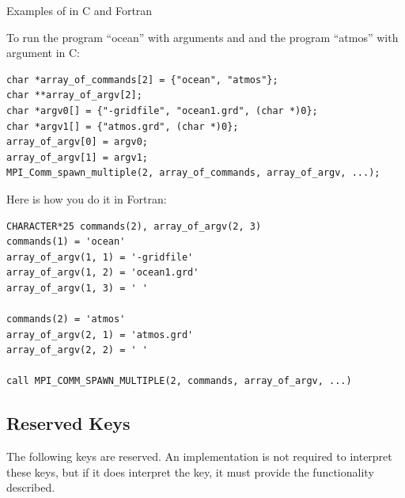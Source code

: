 \begin{example}
Examples of  in C and Fortran
%

\noindent To run the program ``ocean'' with arguments  and
 and the program ``atmos'' with argument 
in C:
\begin{lstlisting}[language={[MPI]C}]
char *array_of_commands[2] = {"ocean", "atmos"};
char **array_of_argv[2];
char *argv0[] = {"-gridfile", "ocean1.grd", (char *)0};
char *argv1[] = {"atmos.grd", (char *)0};
array_of_argv[0] = argv0;
array_of_argv[1] = argv1;
MPI_Comm_spawn_multiple(2, array_of_commands, array_of_argv, ...);
\end{lstlisting}
Here is how you do it in Fortran:
\begin{lstlisting}[language={[MPI]Fortran}]
CHARACTER*25 commands(2), array_of_argv(2, 3)
commands(1) = 'ocean'
array_of_argv(1, 1) = '-gridfile'
array_of_argv(1, 2) = 'ocean1.grd'
array_of_argv(1, 3) = ' '

commands(2) = 'atmos'
array_of_argv(2, 1) = 'atmos.grd'
array_of_argv(2, 2) = ' '

call MPI_COMM_SPAWN_MULTIPLE(2, commands, array_of_argv, ...)
\end{lstlisting}
\end{example}

\subsection{Reserved Keys}
\label{subsec:spawnkeys}

The following keys are reserved. An
implementation is not required to interpret these keys, but if it does
interpret the key, it must provide the functionality described.

